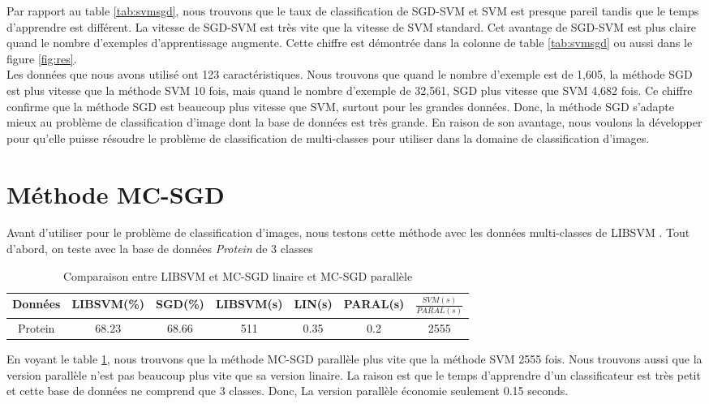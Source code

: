\pagebreak
Par rapport au table \ref{tab:svmsgd}, nous trouvons que le taux de classification de SGD-SVM et SVM est presque pareil tandis que le temps d'apprendre est différent. La vitesse de SGD-SVM est très vite que la vitesse de SVM standard. Cet avantage de SGD-SVM est plus claire quand le nombre d'exemples d'apprentissage augmente. Cette chiffre est démontrée dans la colonne de table \ref{tab:svmsgd} ou aussi dans le figure \ref{fig:res}.\\

Les données que nous avons utilisé ont 123 caractéristiques. Nous trouvons que quand le nombre d'exemple est de 1,605, la méthode SGD est plus vitesse que la méthode SVM 10 fois, mais quand le nombre d'exemple de 32,561, SGD plus vitesse que SVM 4,682 fois. Ce chiffre confirme que la méthode SGD est beaucoup plus vitesse que SVM, surtout pour les grandes données. Donc, la méthode SGD s'adapte mieux au problème de classification d'image dont la base de données est très grande. En raison de son avantage, nous voulons la développer pour qu'elle puisse résoudre le problème de classification de multi-classes pour utiliser dans la domaine de classification d'images.


\section{Méthode MC-SGD}
Avant d'utiliser pour le problème de classification d'images, nous testons cette méthode avec les données multi-classes de LIBSVM \cite{svmdatamul}. Tout d'abord, on teste avec la base de données \textit{Protein} de 3 classes

\pagebreak
\begin{table}
\begin{center}
    \begin{tabular}{ | c | c | c | c | c | c | c |}
    \hline
    Données & LIBSVM(\%) & SGD(\%) & LIBSVM(s) & LIN(s) & PARAL(s) & $\frac{SVM(s)}{PARAL(s)}$ \\ \hline
    
    Protein & 68.23 & 68.66 & 511 & 0.35 & 0.2 & 2555 \\ \hline
    
    \end{tabular}
\end{center}
\caption{Comparaison entre LIBSVM et MC-SGD linaire et MC-SGD parallèle}
\label{tab:mcsvm}
\end{table}

\pagebreak
En voyant le table \ref{tab:mcsvm}, nous trouvons que la méthode MC-SGD parallèle plus vite que la méthode SVM 2555 fois. Nous trouvons aussi que la version parallèle n'est pas beaucoup plus vite que sa version linaire. La raison est que le temps d'apprendre d'un classificateur est très petit et cette base de données ne comprend que 3 classes. Donc, La version parallèle économie seulement 0.15 seconds.\\

